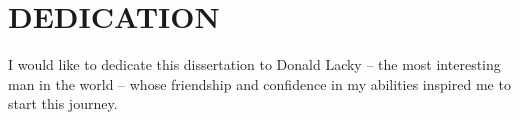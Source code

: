 \chapter*{DEDICATION}
I would like to dedicate this dissertation to Donald Lacky -- the most interesting man in the world -- whose friendship and confidence in my abilities inspired me to start this journey.  


